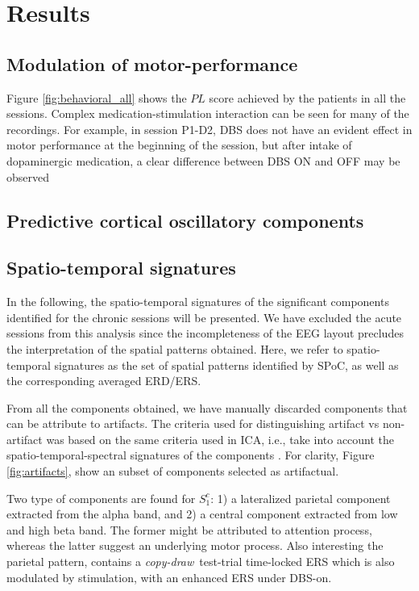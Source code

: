 \documentclass[10pt,a4paper]{article}
\newcommand{\cpdt}[0]{\textit{copy-draw}~test}
\newcommand{\patient}[2]{$S_{#1}^{#2}$}
\begin{document}
\section{Results}
\def \allsessions {VPpcac_d2,VPpcac_d4,NEW,VPpcad_d2,VPpcad_d4,VPpcae_d4,NEW,VPpcaf_d2,
	VPpcaf_d3,VPpcaf_d4,NEW,VPpcag_d2,VPpcag_d3,VPpcag_d4,NEW,VPpcah_d2,NEW,
	VPpcaj_d2,VPpcaj_d3}

\subsection{Modulation of motor-performance}
Figure \ref{fig:behavioral_all} shows the $PL$ score achieved by the patients in all the sessions. Complex medication-stimulation interaction can be seen for many of the recordings. For example, in session P1-D2, DBS does not have an evident effect in motor performance at the beginning of the session, but after intake of dopaminergic medication, a clear difference between DBS ON and OFF may be observed





\subsection{Predictive cortical oscillatory components}



\subsection{Spatio-temporal signatures}
In the following, the spatio-temporal signatures of the significant components identified for the chronic sessions will be presented. We have excluded the acute sessions from this analysis since the incompleteness of the EEG layout precludes the interpretation of the spatial patterns obtained. Here, we refer to spatio-temporal signatures as the set of spatial patterns identified by SPoC, as well as the corresponding averaged ERD/ERS.

From all the components obtained, we have manually discarded components that can be attribute to artifacts. The criteria used for distinguishing artifact vs non-artifact was based on the same criteria used in ICA, i.e., take into account the spatio-temporal-spectral signatures of the components \cite{MARAOrSimilarHowToIdentifyArtifacts}. For clarity, Figure \ref{fig:artifacts}, show an subset of components selected as artifactual.

Two type of components are found for \patient{1}{c}: 1) a lateralized parietal component extracted from the alpha band, and 2) a central component extracted from low and high beta band. The former might be attributed to attention process, whereas the latter suggest an underlying motor process. Also interesting the parietal pattern, contains a \cpdt-trial time-locked ERS which is also modulated by stimulation, with an enhanced ERS under DBS-on. 
\end{document}
